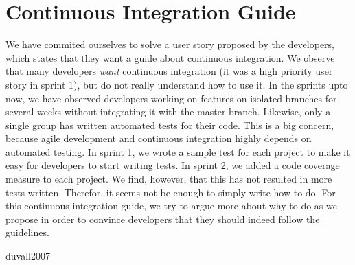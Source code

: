 \chapter{Continuous Integration Guide}
We have commited ourselves to solve a user story proposed by the developers, which states that they want a guide about continuous integration. We observe that many developers \emph{want} continuous integration (it was a high priority user story in sprint 1), but do not really understand how to use it. In the sprints upto now, we have observed developers working on features on isolated branches for several weeks without integrating it with the master branch. Likewise, only a single group has written automated tests for their code. This is a big concern, because agile development and continuous integration highly depends on automated testing. In sprint 1, we wrote a sample test for each project to make it easy for developers to start writing tests. In sprint 2, we added a code coverage measure to each project. We find, however, that this has not resulted in more tests written. Therefor, it seems not be enough to simply write how to do. For this continuous integration guide, we try to argue more about why to do as we propose in order to convince developers that they should indeed follow the guidelines.


 duvall2007

